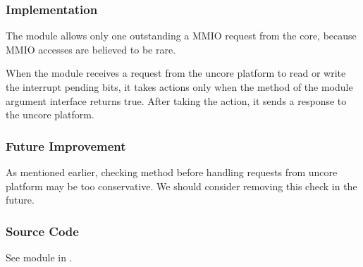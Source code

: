 \subsubsection{Implementation}
The module allows only one outstanding a MMIO request from the core, because MMIO accesses are believed to be rare.

When the module receives a request from the uncore platform to read or write the interrupt pending bits, it takes actions only when the  method of the module argument interface returns true.
After taking the action, it sends a response to the uncore platform.

\subsubsection{Future Improvement}
As mentioned earlier, checking method  before handling requests from uncore platform may be too conservative.
We should consider removing this check in the future.

\subsubsection{Source Code}
See module  in .
